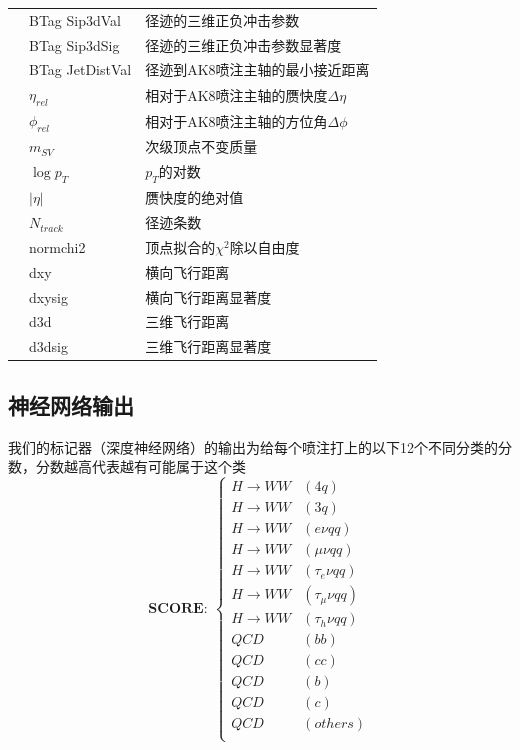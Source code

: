 \begin{table}[htbp]
\begin{tabular}{>{\centering\arraybackslash}p{2.5cm}%
    >{\centering\arraybackslash}p{3cm}%
    >{\centering\arraybackslash}p{9cm}}
    & BTag Sip3dVal & 径迹的三维正负冲击参数\\
    & BTag Sip3dSig & 径迹的三维正负冲击参数显著度\\
    & BTag JetDistVal & 径迹到AK8喷注主轴的最小接近距离\\
    \midrule
    \multirow{11}{*}{次级顶点} & $\eta_{rel}$ & 相对于AK8喷注主轴的赝快度$\Delta \eta$\\
    & $\phi_{rel}$ & 相对于AK8喷注主轴的方位角$\Delta \phi$\\
    & $m_{SV}$ & 次级顶点不变质量\\
    & $\log{p_T}$ & $p_T$的对数\\
    & $|\eta|$ & 赝快度的绝对值\\
    & $N_{track}$ & 径迹条数\\
    & normchi2 & 顶点拟合的$\chi^2$除以自由度\\
    & dxy & 横向飞行距离\\
    & dxysig & 横向飞行距离显著度\\
    & d3d & 三维飞行距离\\
    & d3dsig & 三维飞行距离显著度\\
    \bottomrule\bottomrule
\end{tabular}
\end{table}

\subsection{神经网络输出}
我们的标记器（深度神经网络）的输出为给每个喷注打上的以下12个不同分类的分数，分数越高代表越有可能属于这个类
\begin{equation*}
    \textbf{SCORE}:\ \left\{
    \begin{aligned}
    H\to WW&(4q)\\
    H\to WW&(3q)\\
    H\to WW&(e\nu qq)\\
    H\to WW&(\mu\nu qq)\\
    H\to WW&(\tau_e\nu qq)\\
    H\to WW&(\tau_\mu\nu qq)\\
    H\to WW&(\tau_h\nu qq)\\
    QCD&(bb)\\
    QCD&(cc)\\
    QCD&(b)\\
    QCD&(c)\\
    QCD&(others)\\
    \end{aligned}
    \right.
\end{equation*}

